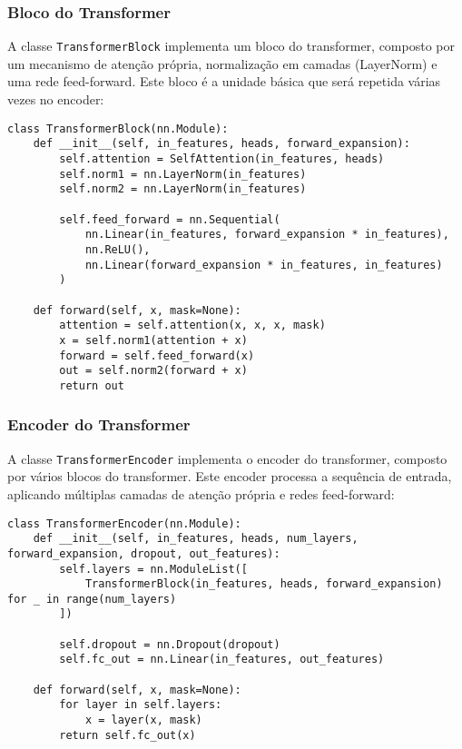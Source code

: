 \subsubsection{Bloco do Transformer}

A classe \texttt{TransformerBlock} implementa um bloco do transformer, composto por um mecanismo de atenção própria, normalização em camadas (LayerNorm) e uma rede feed-forward. Este bloco é a unidade básica que será repetida várias vezes no encoder:

\begin{verbatim}
class TransformerBlock(nn.Module):
	def __init__(self, in_features, heads, forward_expansion):
		self.attention = SelfAttention(in_features, heads)
		self.norm1 = nn.LayerNorm(in_features)
		self.norm2 = nn.LayerNorm(in_features)
		
		self.feed_forward = nn.Sequential(
			nn.Linear(in_features, forward_expansion * in_features),
			nn.ReLU(),
			nn.Linear(forward_expansion * in_features, in_features)
		)
		
	def forward(self, x, mask=None):
		attention = self.attention(x, x, x, mask)
		x = self.norm1(attention + x)
		forward = self.feed_forward(x)
		out = self.norm2(forward + x)
		return out
\end{verbatim}

\subsubsection{Encoder do Transformer}

A classe \texttt{TransformerEncoder} implementa o encoder do transformer, composto por vários blocos do transformer. Este encoder processa a sequência de entrada, aplicando múltiplas camadas de atenção própria e redes feed-forward:

\begin{verbatim}
class TransformerEncoder(nn.Module):
	def __init__(self, in_features, heads, num_layers, forward_expansion, dropout, out_features):
		self.layers = nn.ModuleList([
			TransformerBlock(in_features, heads, forward_expansion) for _ in range(num_layers)
		])
		
		self.dropout = nn.Dropout(dropout)
		self.fc_out = nn.Linear(in_features, out_features)
		
	def forward(self, x, mask=None):
		for layer in self.layers:
			x = layer(x, mask)
		return self.fc_out(x)
\end{verbatim}


